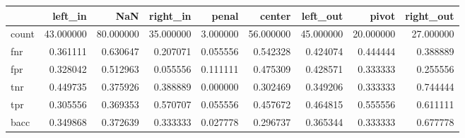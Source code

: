 \begin{tabular}{lrrrrrrrr}
\toprule
{} &    left\_in &        NaN &   right\_in &     penal &     center &   left\_out &      pivot &  right\_out \\
\midrule
count &  43.000000 &  80.000000 &  35.000000 &  3.000000 &  56.000000 &  45.000000 &  20.000000 &  27.000000 \\
fnr   &   0.361111 &   0.630647 &   0.207071 &  0.055556 &   0.542328 &   0.424074 &   0.444444 &   0.388889 \\
fpr   &   0.328042 &   0.512963 &   0.055556 &  0.111111 &   0.475309 &   0.428571 &   0.333333 &   0.255556 \\
tnr   &   0.449735 &   0.375926 &   0.388889 &  0.000000 &   0.302469 &   0.349206 &   0.333333 &   0.744444 \\
tpr   &   0.305556 &   0.369353 &   0.570707 &  0.055556 &   0.457672 &   0.464815 &   0.555556 &   0.611111 \\
bacc  &   0.349868 &   0.372639 &   0.333333 &  0.027778 &   0.296737 &   0.365344 &   0.333333 &   0.677778 \\
\bottomrule
\end{tabular}
